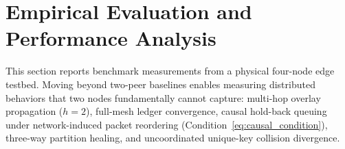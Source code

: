 \begin{table}[!t]
\caption{Source Code Organization and Lines-of-Code Breakdown}
\label{tab:loc_breakdown}
\centering
{}
\end{table}

\section{Empirical Evaluation and Performance Analysis}
\label{sec:evaluation}

This section reports benchmark measurements from a physical four-node edge testbed. Moving beyond two-peer baselines enables measuring distributed behaviors that two nodes fundamentally cannot capture: multi-hop overlay propagation ($h=2$), full-mesh ledger convergence, causal hold-back queuing under network-induced packet reordering (Condition~\eqref{eq:causal_condition}), three-way partition healing, and uncoordinated unique-key collision divergence.

